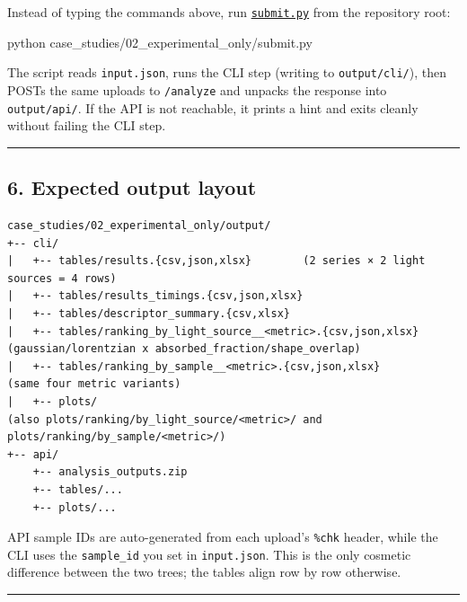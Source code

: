 \documentclass[
  11pt,
]{article}
\newenvironment{Shaded}{}{}
\newcommand{\ExtensionTok}[1]{#1}
\newcommand{\NormalTok}[1]{#1}
\begin{document}
Instead of typing the commands above, run
\href{https://github.com/pinarsyt/overlap-calculator/blob/main/case_studies/02_experimental_only/submit.py}{\texttt{submit.py}}
from the repository root:

\begin{Shaded}
\begin{Highlighting}[]
\ExtensionTok{python}\NormalTok{ case\_studies/02\_experimental\_only/submit.py}
\end{Highlighting}
\end{Shaded}

The script reads \texttt{input.json}, runs the CLI step (writing to
\texttt{output/cli/}), then POSTs the same uploads to \texttt{/analyze}
and unpacks the response into \texttt{output/api/}. If the API is not
reachable, it prints a hint and exits cleanly without failing the CLI
step.

\begin{center}\rule{0.5\linewidth}{0.5pt}\end{center}

\hypertarget{6-expected-output-layout}{
\subsection{6. Expected output layout}\label{6-expected-output-layout}}

\begin{verbatim}
case_studies/02_experimental_only/output/
+-- cli/
|   +-- tables/results.{csv,json,xlsx}        (2 series × 2 light sources = 4 rows)
|   +-- tables/results_timings.{csv,json,xlsx}
|   +-- tables/descriptor_summary.{csv,xlsx}
|   +-- tables/ranking_by_light_source__<metric>.{csv,json,xlsx}   (gaussian/lorentzian x absorbed_fraction/shape_overlap)
|   +-- tables/ranking_by_sample__<metric>.{csv,json,xlsx}          (same four metric variants)
|   +-- plots/                                                      (also plots/ranking/by_light_source/<metric>/ and plots/ranking/by_sample/<metric>/)
+-- api/
    +-- analysis_outputs.zip
    +-- tables/...
    +-- plots/...
\end{verbatim}

API sample IDs are auto-generated from each upload's \texttt{\%chk}
header, while the CLI uses the \texttt{sample\_id} you set in
\texttt{input.json}. This is the only cosmetic difference between the
two trees; the tables align row by row otherwise.

\begin{center}\rule{0.5\linewidth}{0.5pt}\end{center}
\end{document}
